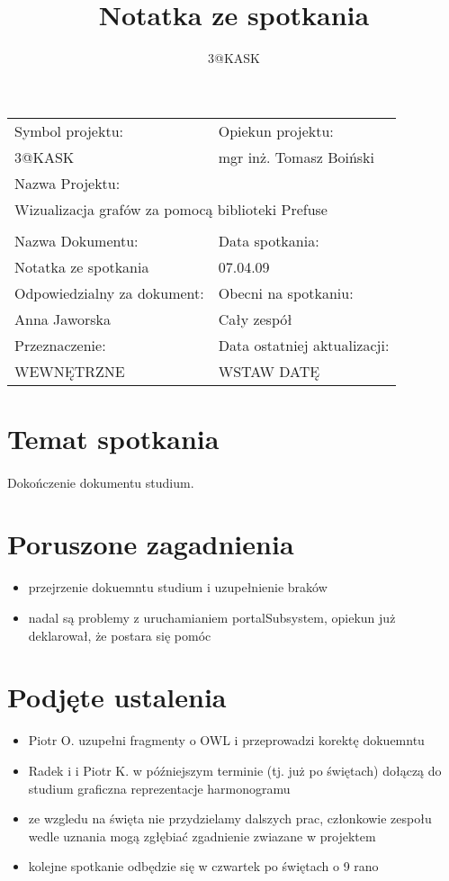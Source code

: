 \documentclass[a4paper,10pt]{article}
\title{Notatka ze spotkania}
\author{3@KASK}
\begin{document}



\maketitle


\begin{center}
\begin{tabular}{|p{7cm}|p{7cm}|}
\hline
Symbol projektu: & Opiekun projektu:   \tabularnewline 
3@KASK & mgr inż. Tomasz Boiński    \tabularnewline \hline
\multicolumn{2}{|l|}{Nazwa Projektu: } \tabularnewline
\multicolumn{2}{|l|}{Wizualizacja grafów za pomocą biblioteki Prefuse } \tabularnewline 
\hline
\multicolumn{2}{l}{ } \tabularnewline %
\hline 
Nazwa Dokumentu: & Data spotkania:   \tabularnewline 
Notatka ze spotkania & 07.04.09 \tabularnewline \hline
Odpowiedzialny za dokument: & Obecni na spotkaniu:   \tabularnewline 
Anna Jaworska & Cały zespół \tabularnewline \hline
Przeznaczenie: & Data ostatniej aktualizacji:   \tabularnewline 
WEWNĘTRZNE & WSTAW DATĘ \tabularnewline \hline
\end{tabular}
\end{center}



\section{Temat spotkania}
\paragraph{} Dokończenie dokumentu studium. 


\section{Poruszone zagadnienia}
\begin{itemize}
 \item przejrzenie dokuemntu studium i uzupełnienie braków
 \item nadal są problemy z uruchamianiem portalSubsystem, opiekun już deklarował, że postara się pomóc 
\end{itemize}



\section{Podjęte ustalenia}
\begin{itemize}
 \item Piotr O. uzupełni fragmenty o OWL i przeprowadzi korektę dokuemntu
\item Radek i i Piotr K. w późniejszym terminie (tj. już po świętach) dołączą do studium graficzna reprezentacje harmonogramu
\item ze wzgledu na święta nie przydzielamy dalszych prac, członkowie zespołu wedle uznania mogą zgłębiać zgadnienie zwiazane w projektem
\item kolejne spotkanie odbędzie się w czwartek po świętach o 9 rano 


\end{itemize}


\newpage
\tableofcontents
\newpage


\clearpage
{}
{}

\end{document}
